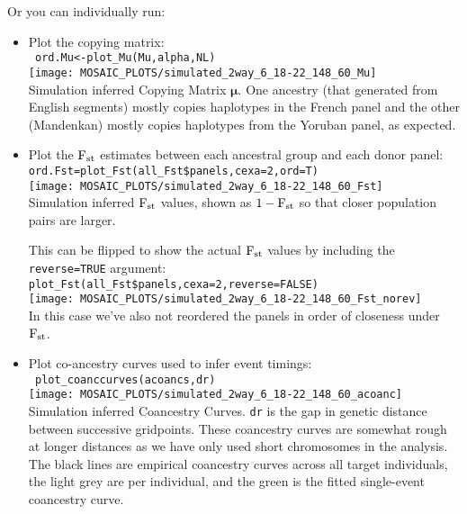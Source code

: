 \documentclass{article}
\begin{document}
Or you can individually run:
\begin{itemize}
  \item Plot the copying matrix:\\
\verb+ ord.Mu<-plot_Mu(Mu,alpha,NL) +\\
    \texttt{[image: MOSAIC\_PLOTS/simulated\_2way\_6\_18-22\_148\_60\_Mu]}\\
    Simulation inferred Copying Matrix $\bm\mu$. One ancestry (that generated from English segments)
    mostly copies haplotypes in the French panel and the other (Mandenkan) mostly copies haplotypes
    from the Yoruban panel, as expected. 
    
  \item Plot the $\textrm{F}_{\textrm{st}}$ estimates between each ancestral group and each donor panel:\\
    \verb+ord.Fst=plot_Fst(all_Fst$panels,cexa=2,ord=T)+\\
    \texttt{[image: MOSAIC\_PLOTS/simulated\_2way\_6\_18-22\_148\_60\_Fst]}\\
    Simulation inferred $\textrm{F}_{\textrm{st}}$ values, shown as $1-\textrm{F}_{\textrm{st}}$ so that closer population pairs are larger. 
    
    This can be flipped to show the
    actual $\textrm{F}_{\textrm{st}}$ values by including the \texttt{reverse=TRUE} argument:\\
    \verb+plot_Fst(all_Fst$panels,cexa=2,reverse=FALSE)+\\
    \texttt{[image: MOSAIC\_PLOTS/simulated\_2way\_6\_18-22\_148\_60\_Fst\_norev]}\\
    In this case we've also not reordered the panels in order of closeness under $\textrm{F}_{\textrm{st}}$. 

\item Plot co-ancestry curves used to infer event timings:\\
\verb+ plot_coanccurves(acoancs,dr)+\\
    \texttt{[image: MOSAIC\_PLOTS/simulated\_2way\_6\_18-22\_148\_60\_acoanc]}\\
    Simulation inferred Coancestry Curves. \texttt{dr} is the gap in genetic distance between successive gridpoints. 
    These coancestry curves are somewhat rough at longer distances as we have only used short chromosomes in the analysis. 
    The black lines are empirical coancestry curves across all target individuals, the light grey are per individual, and the green is
    the fitted single-event coancestry curve. 



\end{itemize}
\end{document}
